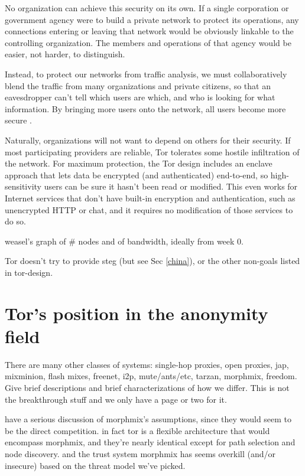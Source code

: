 \documentclass{llncs}
\begin{document}
No organization can achieve this security on its own.  If a single
corporation or government agency were to build a private network to
protect its operations, any connections entering or leaving that network
would be obviously linkable to the controlling organization.  The members
and operations of that agency would be easier, not harder, to distinguish.

Instead, to protect our networks from traffic analysis, we must
collaboratively blend the traffic from many organizations and private
citizens, so that an eavesdropper can't tell which users are which,
and who is looking for what information.  By bringing more users onto
the network, all users become more secure \cite{econymics}.

Naturally, organizations will not want to depend on others for their
security.  If most participating providers are reliable, Tor tolerates
some hostile infiltration of the network.  For maximum protection,
the Tor design includes an enclave approach that lets data be encrypted
(and authenticated) end-to-end, so high-sensitivity users can be sure it
hasn't been read or modified.  This even works for Internet services that
don't have built-in encryption and authentication, such as unencrypted
HTTP or chat, and it requires no modification of those services to do so.

weasel's graph of \# nodes and of bandwidth, ideally from week 0.

Tor doesn't try to provide steg (but see Sec \ref{china}), or
the other non-goals listed in tor-design.

\section{Tor's position in the anonymity field}
\label{sec:related}

There are many other classes of systems: single-hop proxies, open proxies,
jap, mixminion, flash mixes, freenet, i2p, mute/ants/etc, tarzan,
morphmix, freedom. Give brief descriptions and brief characterizations
of how we differ. This is not the breakthrough stuff and we only have
a page or two for it.

have a serious discussion of morphmix's assumptions, since they would
seem to be the direct competition. in fact tor is a flexible architecture
that would encompass morphmix, and they're nearly identical except for
path selection and node discovery. and the trust system morphmix has
seems overkill (and/or insecure) based on the threat model we've picked.
\end{document}
